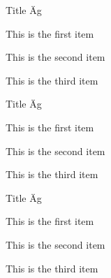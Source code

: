 \documentclass[a4paper, 10pt]{extarticle}
\begin{document}
\lipsum[1]
\begin{fancyblock}[blue]{Title \"Ag}
\lipsum[1]

\begin{fancylist}
\item This is the first item
\item This is the second item
\item This is the third item
\end{fancylist}

\lipsum[1]
\end{fancyblock}
\begin{fancyblock*}[blue]{Title \"Ag}
\lipsum[1]

\begin{fancylist}
\item This is the first item
\item This is the second item
\item This is the third item
\end{fancylist}

\lipsum[1]
\end{fancyblock*}
\begin{fancyblock+}[blue]{Title \"Ag}
\lipsum[1]

\begin{fancylist}
\item This is the first item
\item This is the second item
\item This is the third item
\end{fancylist}

\lipsum[1]
\end{fancyblock+}
\lipsum[1]
\end{document}
